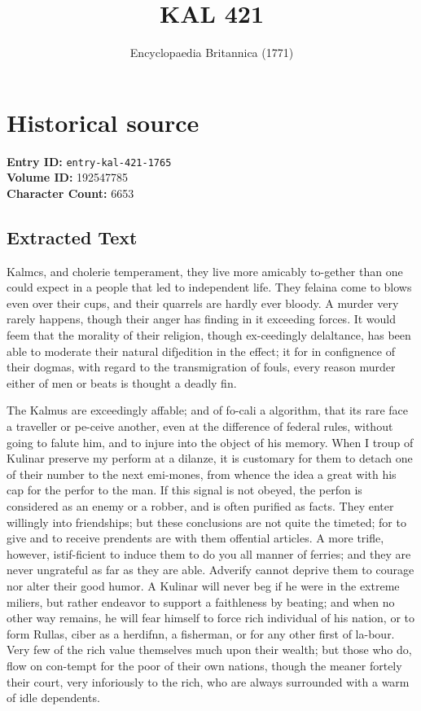 \documentclass{article}
\title{KAL  421}
\date{Encyclopaedia Britannica (1771)}
\begin{document}
\maketitle

\section*{Historical source}
\textbf{Entry ID:} \texttt{entry-kal-421-1765} \\
\textbf{Volume ID:} 192547785 \\
\textbf{Character Count:} 6653

\subsection*{Extracted Text}
Kalmcs, and cholerie temperament, they live more amicably to-gether than one could expect in a people that led to independent life. They felaina come to blows even over their cups, and their quarrels are hardly ever bloody. A murder very rarely happens, though their anger has finding in it exceeding forces. It would feem that the morality of their religion, though ex-ceedingly delaltance, has been able to moderate their natural difjedition in the effect; it for in confignence of their dogmas, with regard to the transmigration of fouls, every reason murder either of men or beats is thought a deadly fin.

The Kalmus are exceedingly affable; and of fo-cali a algorithm, that its rare face a traveller or pe-ceive another, even at the difference of federal rules, without going to falute him, and to injure into the object of his memory. When I troup of Kulinar preserve my perform at a dilanze, it is customary for them to detach one of their number to the next emi-mones, from whence the idea a great with his cap for the perfor to the man. If this signal is not obeyed, the perfon is considered as an enemy or a robber, and is often purified as facts. They enter willingly into friendships; but these conclusions are not quite the timeted; for to give and to receive prendents are with them offential articles. A more trifle, however, istif-ficient to induce them to do you all manner of ferries; and they are never ungrateful as far as they are able. Adverify cannot deprive them to courage nor alter their good humor. A Kulinar will never beg if he were in the extreme miliers, but rather endeavor to support a faithleness by beating; and when no other way remains, he will fear himself to force rich individual of his nation, or to form Rullas, ciber as a herdifnn, a fisherman, or for any other first of la-bour. Very few of the rich value themselves much upon their wealth; but those who do, flow on con-tempt for the poor of their own nations, though the meaner fortely their court, very inforiously to the rich, who are always surrounded with a warm of idle dependents.
\end{document}
